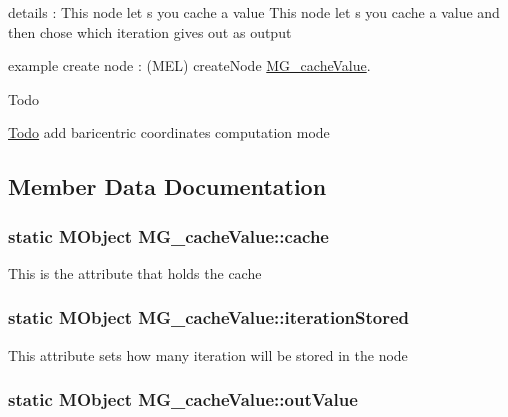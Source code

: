 details \-: This node let s you cache a value This node let s you cache a value and then chose which iteration gives out as output

example create node \-: (M\-E\-L) create\-Node \hyperlink{class_m_g__cache_value}{M\-G\-\_\-cache\-Value}.

\begin{DoxyRefDesc}{Todo}
\item[\hyperlink{todo__todo000006}{Todo}]add baricentric coordinates computation mode\end{DoxyRefDesc}


\subsection{Member Data Documentation}
\hypertarget{class_m_g__cache_value_af41d3e0480acf043362b219ccab05313}{
\subsubsection[{cache}]{\setlength{\rightskip}{0pt plus 5cm}static M\-Object M\-G\-\_\-cache\-Value\-::cache\hspace{0.3cm}{\ttfamily [static]}}}\label{class_m_g__cache_value_af41d3e0480acf043362b219ccab05313}
This is the attribute that holds the cache \hypertarget{class_m_g__cache_value_a2c30422a3a121f421f0c5e7fcb409848}{
\subsubsection[{iteration\-Stored}]{\setlength{\rightskip}{0pt plus 5cm}static M\-Object M\-G\-\_\-cache\-Value\-::iteration\-Stored\hspace{0.3cm}{\ttfamily [static]}}}\label{class_m_g__cache_value_a2c30422a3a121f421f0c5e7fcb409848}
This attribute sets how many iteration will be stored in the node \hypertarget{class_m_g__cache_value_ab5b43d3f3f79cc1dbf14d2351fda4ce6}{
\subsubsection[{out\-Value}]{\setlength{\rightskip}{0pt plus 5cm}static M\-Object M\-G\-\_\-cache\-Value\-::out\-Value\hspace{0.3cm}{\ttfamily [static]}}}\label{class_m_g__cache_value_ab5b43d3f3f79cc1dbf14d2351fda4ce6}
